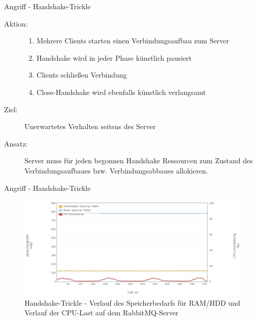 \documentclass[10pt]{beamer}
\begin{document}
\begin{frame}[t]{Angriff - Handshake-Trickle}
\begin{description}
	\item[Aktion:]
		\begin{enumerate}
			\item Mehrere Clients starten einen Verbindungsaufbau zum Server
			\item Handshake wird in jeder Phase künstlich pausiert
			\item Clients schließen Verbindung
			\item Close-Handshake wird ebenfalls künstlich verlangsamt 
		\end{enumerate} \smallskip
	\item[Ziel:] Unerwartetes Verhalten seitens des Server  \smallskip
	\item[Ansatz:] Server muss für jeden begonnen Handshake Ressourcen zum Zustand des Verbindungsaufbaues bzw. Verbindungsabbaues allokieren.
\end{description}
\end{frame}

\begin{frame}{Angriff - Handshake-Trickle}
\begin{figure}[!htb]
	\centering
	\includegraphics[width=\textwidth]{img/handshake/handshake_server1.png}
	\caption{\centering Handshake-Trickle - Verlauf des Speicherbedarfs für RAM/HDD und Verlauf der CPU-Last auf dem RabbitMQ-Server}
	\label{fig:handshake-server1}
\end{figure}
\end{frame}
\end{document}
